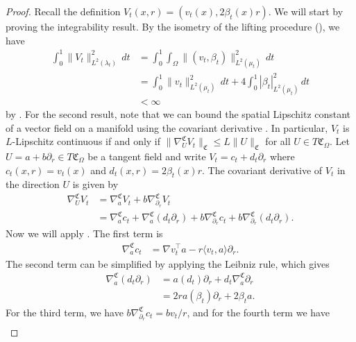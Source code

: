 \documentclass[11pt]{article}
\begin{document}
\begin{proof}
    Recall the definition $V_t(x,r) = (v_t(x), 2\beta_t(x)r)$. We will start by proving the integrability result. By the isometry of the lifting procedure (), we have
    \begin{align*}
        \int_0^1 \|V_t\|_{L^2(\lambda_t)}^2 \, dt &= \int_0^1 \int_{\Omega} \|(v_t, \beta_t)\|_{L^2(\mu_t)}^2 \, dt \\
        &= \int_0^1 \|v_t\|_{L^2(\mu_t)}^2\, dt + 4\int_0^1|\beta_t|^2_{L^2(\mu_t)}\, dt \\
        &< \infty 
    \end{align*}
    by . For the second result, note that we can bound the spatial Lipschitz constant of a vector field on a manifold using the covariant derivative \citet[Proposition 10.46]{boumal2023introduction}. In particular, $V_t$ is $L$-Lipschitz continuous if and only if $\|\nabla^{\mathfrak{C}}_UV_t\|_{\mathfrak{C}} \leq L\|U\|_{\mathfrak{C}}$ for all $U\in T\mathfrak{C}_\Omega$. Let $U = a + b\partial_r \in T\mathfrak{C}_\Omega$ be a tangent field and write $V_t = c_t + d_t \partial_r$ where $c_t(x,r) = v_t(x)$ and $d_t(x,r) = 2\beta_t(x)r$. The covariant derivative of $V_t$ in the direction $U$ is given by 
    \begin{align*}
        \nabla^{\mathfrak{C}}_{U}V_t &= \nabla_a^{\mathfrak{C}}V_t + b \nabla ^{\mathfrak{C}}_{\partial_r}V_t \\
        &= \nabla_a^{\mathfrak{C}}c_t + \nabla_a^{\mathfrak{C}}(d_t\partial_r) + b\nabla ^{\mathfrak{C}}_{\partial_r}c_t + b\nabla_{\partial_r}^{\mathfrak{C}}(d_t\partial_r).
    \end{align*}
    Now we will apply . The first term is
    \begin{align*}
        \nabla_a^{\mathfrak{C}}c_t &= \nabla v_t^\top a - r\langle v_t, a\rangle \partial_r.
    \end{align*}
    The second term can be simplified by applying the Leibniz rule, which gives
    \begin{align*}
        \nabla _a^\mathfrak{C}(d_t\partial_r) &= a(d_t)\partial_r + d_t \nabla_a^\mathfrak{C}\partial_r \\
        &= 2ra(\beta_t) \partial_r + 2\beta_ta.
    \end{align*}
    For the third term, we have $b\nabla_{\partial_r}^\mathfrak{C}c_t = bv_t/r$, and for the fourth term we have
    \begin{align*}

\end{align*}
\end{proof}
\end{document}
